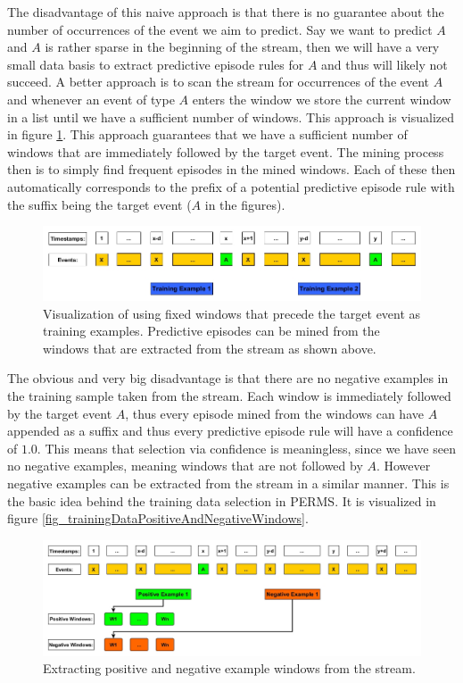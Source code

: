 The disadvantage of this naive approach is that there is no guarantee about the number of occurrences of the event we aim to predict. Say we want to predict $A$ and $A$ is rather sparse in the beginning of the stream, then we will have a very small data basis to extract predictive episode rules for $A$ and thus will likely not succeed. 
A better approach is to scan the stream for occurrences of the event $A$ and whenever an event of type $A$ enters the window we store the current window in a list until we have a sufficient number of windows. This approach is visualized in figure \ref{fig_trainingDataWindowsOfA}. This approach guarantees that we have a sufficient number of windows that are immediately followed by the target event. The mining process then is to simply find frequent episodes in the mined windows. Each of these then automatically corresponds to the prefix of a potential predictive episode rule with the suffix being the target event ($A$ in the figures).

\begin{figure}[h]
	\centering
  	\includegraphics[width=\textwidth]{trainingDataWindowsOfA}
	\caption{Visualization of using fixed windows that precede the target event as training examples. Predictive episodes can be mined from the windows that are extracted from the stream as shown above.}
	\label{fig_trainingDataWindowsOfA}
\end{figure}

The obvious and very big disadvantage is that there are no negative examples in the training sample taken from the stream. Each window is immediately followed by the target event $A$, thus every episode mined from the windows can have $A$ appended as a suffix and thus every predictive episode rule will have a confidence of $1.0$. This means that selection via confidence is meaningless, since we have seen no negative examples, meaning windows that are not followed by $A$. However negative examples can be extracted from the stream in a similar manner. This is the basic idea behind the training data selection in PERMS. It is visualized in figure \ref{fig_trainingDataPositiveAndNegativeWindows}. 

\begin{figure}[h]
	\centering
  	\includegraphics[width=\textwidth]{trainingDataPositiveAndNegativeWindows}
	\caption{Extracting positive and negative example windows from the stream.}
	\label{fig_trainingDataNaive}
\end{figure}

